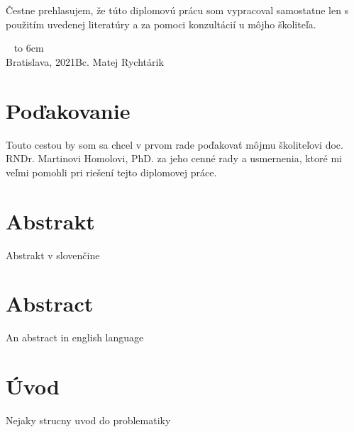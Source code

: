 \documentclass[12pt, a4paper, oneside]{book}
\newcommand\mfauthor{Bc. Matej Rychtárik}
\newcommand\mfplacedate{Bratislava, 2021}
\begin{document}


\thispagestyle{empty}

%

{~}\vspace{12cm}

\noindent
\begin{minipage}{0.25\textwidth}~\end{minipage}
\begin{minipage}{0.75\textwidth}
Čestne prehlasujem, že túto diplomovú prácu som vypracoval samostatne len s použitím uvedenej literatúry a za pomoci konzultácií u môjho školiteľa.
\newline \newline
\end{minipage}
\vfill
~ \hfill {\hbox to 6cm{\dotfill}} \\
\mfplacedate \hfill \mfauthor
\vfill\eject 

\chapter*{Poďakovanie}\label{chap:thank_you}
Touto cestou by som sa chcel v prvom rade poďakovať môjmu školiteľovi doc. RNDr. Martinovi Homolovi, PhD. za jeho cenné rady a usmernenia, ktoré mi veľmi pomohli pri riešení tejto diplomovej práce. 
\vfill\eject 

\chapter*{Abstrakt}\label{chap:abstract_sk}
Abstrakt v slovenčine

\chapter*{Abstract}\label{chap:abstract_en}
An abstract in english language

\tableofcontents

\mainmatter

\chapter{Úvod}\label{chap:intro}
Nejaky strucny uvod do problematiky

\end{document}
